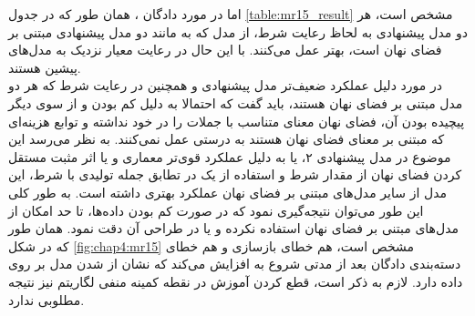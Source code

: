 اما در مورد دادگان \sst{}، همان طور که در جدول \ref{table:mr15_result} مشخص است، هر دو مدل پیشنهادی به لحاظ رعایت شرط، از مدل \towardctg{} که به مانند دو مدل پیشنهادی مبتنی بر فضای نهان است، بهتر عمل می‌کنند. با این حال در رعایت معیار \jaccard{} نزدیک به مدل‌های پیشین هستند.
\\
در مورد دلیل عملکرد ضعیف‌تر مدل پیشنهادی و همچنین \towardctg{} در رعایت شرط که هر دو مدل مبتنی بر فضای نهان هستند، باید گفت که احتمالا به دلیل کم بودن و از سوی دیگر پیچیده بودن آن، فضای نهان معنای متناسب با جملات را در خود نداشته و توابع هزینه‌ای که مبتنی بر معنای فضای نهان هستند به درستی عمل نمی‌کنند. به نظر می‌رسد این موضوع در مدل پیشنهادی ۲، یا به دلیل عملکرد قوی‌تر معماری \transformer{} و یا اثر مثبت مستقل کردن فضای نهان از مقدار شرط و استفاده از یک \classifier{} در تطابق جمله تولیدی با شرط، این مدل از سایر مدل‌های مبتنی بر فضای نهان عملکرد بهتری داشته است. به طور کلی این طور می‌توان نتیجه‌گیری نمود که در صورت کم بودن داده‌ها، تا حد امکان از مدل‌های مبتنی بر فضای نهان استفاده نکرده و یا در طراحی آن دقت نمود. همان طور که در شکل \ref{fig:chap4:mr15} مشخص است، هم خطای بازسازی و هم خطای دسته‌بندی دادگان \validation{} بعد از مدتی شروع به افزایش می‌کند که نشان از 
شدن مدل بر روی داده دارد. لازم به ذکر است، قطع کردن آموزش در نقطه کمینه منفی لگاریتم \likelihood{} نیز نتیجه مطلوبی ندارد.
